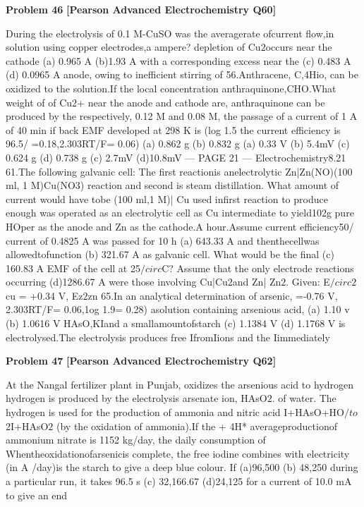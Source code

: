 \begin{problembox}
\textbf{Problem 46} \hfill \textbf{[Pearson Advanced Electrochemistry Q60]}
\label{q:ext-pearson-46}

During the electrolysis of 0.1 M-CuSO
was the averagerate ofcurrent flow,in
solution using copper electrodes,a
ampere?
depletion of Cu$2$occurs near the cathode
(a) 0.965 A
(b)1.93 A
with a corresponding excess near the
(c) 0.483 A
(d) 0.0965 A
anode, owing to inefficient stirring of
56.Anthracene, C,4Hio, can be oxidized to
the solution.If the local concentration
anthraquinone,CHO.What weight of
of Cu$2$+ near the anode and cathode are,
anthraquinone can be produced by the
respectively, 0.12 M and 0.08 M, the
passage of a current of 1 A of 40 min if
back EMF developed at 298 K is (log 1.5
the current efficiency is 96.5/%
=0.18,2.303RT/F= 0.06)
(a) 0.862 g
(b) 0.832 g
(a) 0.33 V
(b) 5.4mV
(c) 0.624 g
(d) 0.738 g
(c) 2.7mV
(d)10.8mV
--- PAGE 21 ---
Electrochemistry8.21
61.The following galvanic cell:
The first reactionis anelectrolytic
Zn|Zn(NO)(100 ml, 1 M)Cu(NO3)
reaction and second is steam distillation.
What amount of current would have tobe
(100 ml,1 M)| Cu
used infirst reaction to produce enough
was operated as an electrolytic cell as Cu
intermediate to yield102g pure HOper
as the anode and Zn as the cathode.A
hour.Assume current efficiency50/%
current of 0.4825 A was passed for 10 h
(a) 643.33 A
and thenthecellwas allowedtofunction
(b) 321.67 A
as galvanic cell. What would be the final
(c) 160.83 A
EMF of the cell at 25$/circ$C? Assume that
the only electrode reactions occurring
(d)1286.67 A
were those involving Cu|Cu$2$and Zn|
Zn$2$. Given: E$/circ$$2$cu = +0.34 V, Ez$2$zn
65.In an analytical determination of arsenic,
=-0.76 V, 2.303RT/F= 0.06,1og 1.9= 0.28)
asolution containing arsenious acid,
(a) 1.10 v
(b) 1.0616 V
HAsO,KIand a smallamountofstarch
(c) 1.1384 V
(d) 1.1768 V
is electrolysed.The electrolysis produces
free IfromIions and the Iimmediately
\end{problembox}

\begin{problembox}
\textbf{Problem 47} \hfill \textbf{[Pearson Advanced Electrochemistry Q62]}
\label{q:ext-pearson-47}

At the Nangal fertilizer plant in Punjab,
oxidizes the arsenious acid to hydrogen
hydrogen is produced by the electrolysis
arsenate ion, HAsO$2$.
of water. The hydrogen is used for the
production of ammonia and nitric acid
I+HAsO+HO$/to$ 2I+HAsO$2$
(by the oxidation of ammonia).If the
+ 4H*
averageproductionof ammonium nitrate
is 1152 kg/day, the daily consumption of
Whentheoxidationofarsenicis
complete, the free iodine combines with
electricity (in A /day)is
the starch to give a deep blue colour. If
(a)96,500
(b) 48,250
during a particular run, it takes 96.5 s
(c) 32,166.67
(d)24,125
for a current of 10.0 mA to give an end
\end{problembox}

